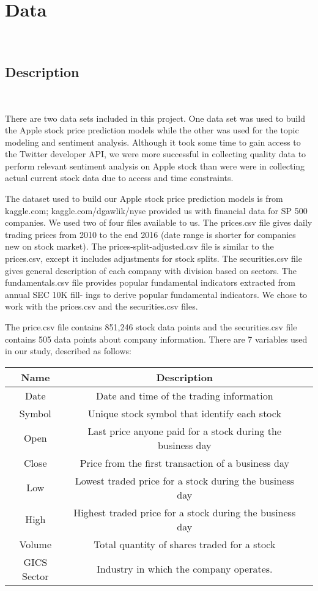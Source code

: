 \documentclass[11pt, oneside]{article}   	%
\begin{document}
\newpage

\section{Data} \

\subsection{Description} \

 There are two data sets included in this project. One data set was used to build the Apple stock price prediction models while the other was used for the topic modeling and sentiment analysis. Although it took some time to gain access to the Twitter developer API, we were more successful in collecting quality data to perform relevant sentiment analysis on Apple stock than were were in collecting actual current stock data due to access and time constraints.

  The dataset used to build our Apple stock price prediction models is from kaggle.com; kaggle.com/dgawlik/nyse provided us with financial data for SP 500 companies. We used two of four files available to us. The prices.csv file gives daily trading prices from 2010 to the end 2016 (date range is shorter for companies new on stock market). The prices-split-adjusted.csv file is similar to the prices.csv, except it includes adjustments for stock splits. The securities.csv file gives general description of each company with division based on sectors. The fundamentals.csv file provides popular fundamental indicators extracted from annual SEC 10K fill- ings to derive popular fundamental indicators. We chose to work with the prices.csv and the securities.csv files.

  The price.csv file contains 851,246 stock data points and the securities.csv file contains 505 data points about company information. There are 7 variables used in our study, described as follows:

\begin{center}
\begin{tabular}{ |c|c|c| } 
 \hline
 Name & Description \\ 
 \hline
 Date & Date and time of the trading information \\ 
 \hline
 Symbol & Unique stock symbol that identify each stock \\ 
 \hline
 Open & Last price anyone paid for a stock during the business day \\ 
 \hline
 Close &  Price from the first transaction of a business day  \\ 
 \hline
 Low & Lowest traded price for a stock during the business day  \\
 \hline
 High & Highest traded price for a stock during the business day  \\ 
 \hline
 Volume & Total quantity of shares traded for a stock \\ 
 \hline
 GICS Sector & Industry in which the company operates.  \\ 

 \hline
\end{tabular}
\end{center}
\end{document}
